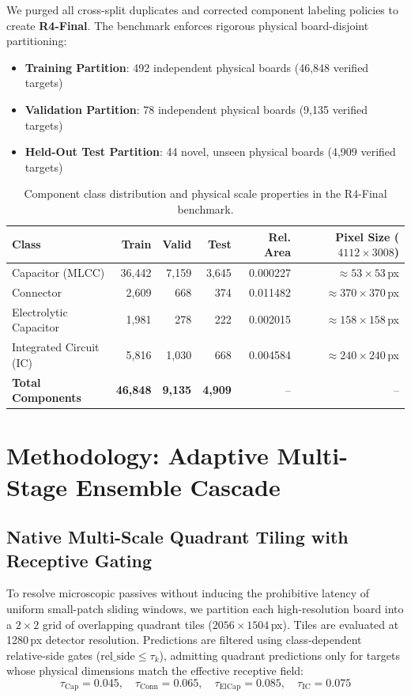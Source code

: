 We purged all cross-split duplicates and corrected component labeling policies to create \textbf{R4-Final}. The benchmark enforces rigorous physical board-disjoint partitioning:
\begin{itemize}
    \item \textbf{Training Partition}: 492 independent physical boards (46,848 verified targets)
    \item \textbf{Validation Partition}: 78 independent physical boards (9,135 verified targets)
    \item \textbf{Held-Out Test Partition}: 44 novel, unseen physical boards (4,909 verified targets)
\end{itemize}

\begin{table}[!t]
\centering
\caption{Component class distribution and physical scale properties in the R4-Final benchmark.}
\label{tab:r4_distribution}
\small\setlength{\tabcolsep}{4.5pt}
\begin{tabular}{lrrrrr}
\toprule
Class & Train & Valid & Test & Rel. Area & Pixel Size ($4112\times3008$) \\
\midrule
Capacitor (MLCC)       & 36,442 & 7,159 & 3,645 & 0.000227 & $\approx 53 \times 53$\,px \\
Connector              & 2,609  & 668   & 374   & 0.011482 & $\approx 370 \times 370$\,px \\
Electrolytic Capacitor & 1,981  & 278   & 222   & 0.002015 & $\approx 158 \times 158$\,px \\
Integrated Circuit (IC)& 5,816  & 1,030 & 668   & 0.004584 & $\approx 240 \times 240$\,px \\
\midrule
\textbf{Total Components} & \textbf{46,848} & \textbf{9,135} & \textbf{4,909} & -- & -- \\
\bottomrule
\end{tabular}
\end{table}

\section{Methodology: Adaptive Multi-Stage Ensemble Cascade}
\label{sec:method}

\subsection{Native Multi-Scale Quadrant Tiling with Receptive Gating}
To resolve microscopic passives without inducing the prohibitive latency of uniform small-patch sliding windows, we partition each high-resolution board into a $2 \times 2$ grid of overlapping quadrant tiles ($2056 \times 1504$\,px). Tiles are evaluated at 1280\,px detector resolution. Predictions are filtered using class-dependent relative-side gates ($\text{rel\_side} \le \tau_k$), admitting quadrant predictions only for targets whose physical dimensions match the effective receptive field:
\begin{equation}
\tau_{\text{Cap}} = 0.045, \quad \tau_{\text{Conn}} = 0.065, \quad \tau_{\text{ElCap}} = 0.085, \quad \tau_{\text{IC}} = 0.075
\end{equation}

